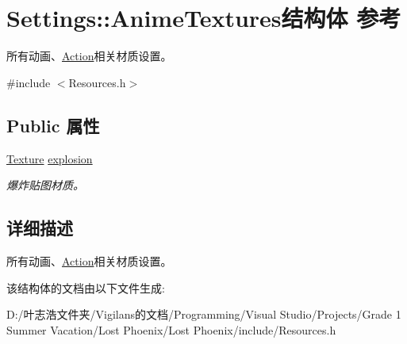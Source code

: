 \hypertarget{struct_settings_1_1_anime_textures}{}\section{Settings\+:\+:Anime\+Textures结构体 参考}
\label{struct_settings_1_1_anime_textures}


所有动画、\hyperlink{class_action}{Action}相关材质设置。  




{\ttfamily \#include $<$Resources.\+h$>$}

\subsection*{Public 属性}
\begin{DoxyCompactItemize}
\item 
\mbox{\label{struct_settings_1_1_anime_textures_ac7d7f8216a2c1f3f06dfcb59d6ed7a10}} 
\hyperlink{struct_texture}{Texture} \hyperlink{struct_settings_1_1_anime_textures_ac7d7f8216a2c1f3f06dfcb59d6ed7a10}{explosion}
\begin{DoxyCompactList}\small\item\em 爆炸贴图材质。 \end{DoxyCompactList}\end{DoxyCompactItemize}


\subsection{详细描述}
所有动画、\hyperlink{class_action}{Action}相关材质设置。 



该结构体的文档由以下文件生成\+:\begin{DoxyCompactItemize}
\item 
D\+:/叶志浩文件夹/\+Vigilans的文档/\+Programming/\+Visual Studio/\+Projects/\+Grade 1 Summer Vacation/\+Lost Phoenix/\+Lost Phoenix/include/Resources.\+h\end{DoxyCompactItemize}
